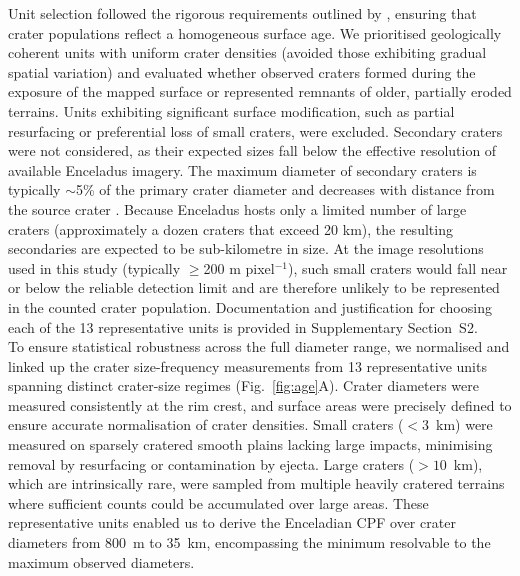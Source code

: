 \documentclass[preprint,11pt,3p,times,authoryear]{elsarticle}
\begin{document}
Unit selection followed the rigorous requirements outlined by \citet{Neukum1983}, ensuring that crater populations reflect a homogeneous surface age. We prioritised geologically coherent units with uniform crater densities (avoided those exhibiting gradual spatial variation) and evaluated whether observed craters formed during the exposure of the mapped surface or represented remnants of older, partially eroded terrains. Units exhibiting significant surface modification, such as partial resurfacing or preferential loss of small craters, were excluded. Secondary craters were not considered, as their expected sizes fall below the effective resolution of available Enceladus imagery. The maximum diameter of secondary craters is typically $\sim$5\% of the primary crater diameter \citet{Schultz1980} and decreases with distance from the source crater \citet{McEwen2006}. Because Enceladus hosts only a limited number of large craters (approximately a dozen craters that exceed 20 km), the resulting secondaries are expected to be sub-kilometre in size. At the image resolutions used in this study (typically $\ge$200 m pixel$^{-1}$), such small craters would fall near or below the reliable detection limit and are therefore unlikely to be represented in the counted crater population. Documentation and justification for choosing each of the 13 representative units is provided in Supplementary Section~S2.\\

To ensure statistical robustness across the full diameter range, we normalised and linked up the crater size-frequency measurements from 13 representative units spanning distinct crater-size regimes (Fig.~\ref{fig:age}A).
Crater diameters were measured consistently at the rim crest, and surface areas were precisely defined to ensure accurate normalisation of crater densities.
Small craters ($<3$~km) were measured on sparsely cratered smooth plains lacking large impacts, minimising removal by resurfacing or contamination by ejecta. Large craters ($>10$~km), which are intrinsically rare, were sampled from multiple heavily cratered terrains where sufficient counts could be accumulated over large areas. These representative units enabled us to derive the Enceladian CPF over crater diameters from 800~m to 35~km, encompassing the minimum resolvable to the maximum observed diameters.
\end{document}
